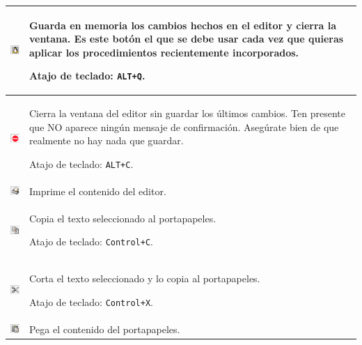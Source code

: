 \begin{center} \begin{longtable}{|m{1.3cm}|m{115mm}|} \hline 
   \includegraphics[scale=1.0]{Imagenes/02_Caracteristicas/guardar.png} &
      Guarda en memoria los cambios hechos en el editor y cierra la ventana.
      Es este bot\'on el que se debe usar cada vez que quieras aplicar los
      procedimientos recientemente incorporados.

      Atajo de teclado: \texttt{ALT+Q}. \\ \hline 
   \includegraphics[scale=1.0]{Imagenes/02_Caracteristicas/salir.png} &
      Cierra la ventana del editor sin guardar los \'ultimos cambios. Ten
      presente que NO aparece ning\'un mensaje de confirmaci\'on. Aseg\'urate
      bien de que realmente no hay nada que guardar.

      Atajo de teclado: \texttt{ALT+C}. \\ \hline 
   \includegraphics[scale=1.0]{Imagenes/02_Caracteristicas/imprimir.png} & 
      Imprime el contenido del editor.\\ \hline 
   \includegraphics[scale=1.0]{Imagenes/02_Caracteristicas/copiar.png} &
      Copia el texto seleccionado al portapapeles.

      Atajo de teclado: \texttt{Control+C}.\\ \hline 
   \includegraphics[scale=1.0]{Imagenes/02_Caracteristicas/cortar.png} &
      Corta el texto seleccionado y lo copia al portapapeles.

      Atajo de teclado: \texttt{Control+X}.\\ \hline 
   \includegraphics[scale=1.0]{Imagenes/02_Caracteristicas/pegar.png}&
      Pega el contenido del portapapeles.


\end{longtable}
\end{center}
